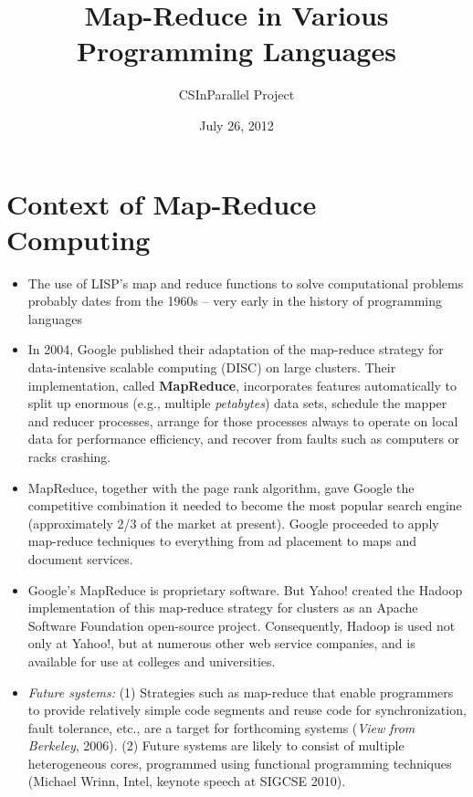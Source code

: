 \documentclass[letterpaper,10pt,openany,oneside]{sphinxmanual}
\title{Map-Reduce in Various Programming Languages}
\date{July 26, 2012}
\author{CSInParallel Project}
\begin{document}
\maketitle
\tableofcontents
{}\label{index::doc}



\chapter{Context of Map-Reduce Computing}
\label{Context/Context:context-of-map-reduce-computing}\label{Context/Context::doc}\label{Context/Context:map-reduce-in-various-programming-languages}\begin{itemize}
\item {} 
The use of LISP's map and reduce functions to solve computational problems probably dates from the 1960s -- very early in the history of programming languages

\item {} 
In 2004, Google published their adaptation of the map-reduce strategy for data-intensive scalable computing (DISC) on large clusters. Their implementation, called \textbf{MapReduce}, incorporates features automatically to split up enormous (e.g., multiple \emph{petabytes}) data sets, schedule the mapper and reducer processes, arrange for those processes always to operate on local data for performance efficiency, and recover from faults such as computers or racks crashing.

\item {} 
MapReduce, together with the page rank algorithm, gave Google the competitive combination it needed to become the most popular search engine (approximately 2/3 of the market at present). Google proceeded to apply map-reduce techniques to everything from ad placement to maps and document services.

\item {} 
Google's MapReduce is proprietary software. But Yahoo! created the Hadoop implementation of this map-reduce strategy for clusters as an Apache Software Foundation open-source project. Consequently, Hadoop is used not only at Yahoo!, but at numerous other web service companies, and is available for use at colleges and universities.

\item {} 
\emph{Future systems:} (1) Strategies such as map-reduce that enable programmers to provide relatively simple code segments and reuse code for synchronization, fault tolerance, etc., are a target for forthcoming systems (\emph{View from Berkeley}, 2006). (2) Future systems are likely to consist of multiple heterogeneous cores, programmed using functional programming techniques (Michael Wrinn, Intel, keynote speech at SIGCSE 2010).

\end{itemize}
\end{document}
